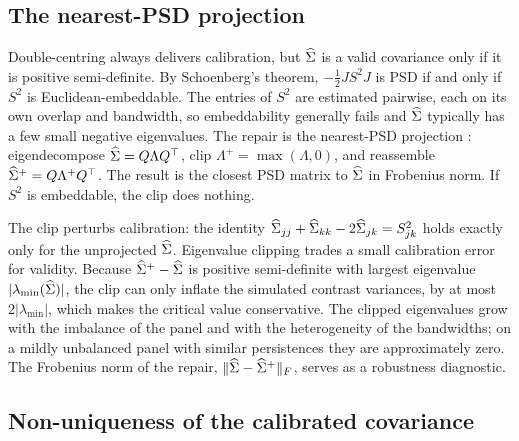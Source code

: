 \subsection{The nearest-PSD projection}
\label{sec:mds-psd}

Double-centring always delivers calibration, but $\widehat{\Sigma}$ is a valid covariance only if it
is positive semi-definite. By Schoenberg's theorem, $-\tfrac12 J S^2 J$ is PSD if and
only if $S^2$ is Euclidean-embeddable. The entries of $S^2$ are estimated pairwise, each
on its own overlap and bandwidth, so embeddability generally fails and $\widehat{\Sigma}$ typically
has a few small negative eigenvalues. The repair is the nearest-PSD projection
\citep{higham1988}: eigendecompose $\widehat{\Sigma} = Q\Lambda Q^\top$, clip
$\Lambda^{+} = \max(\Lambda, 0)$, and reassemble $\widehat{\Sigma}^{+} = Q\Lambda^{+}Q^\top$. The
result is the closest PSD matrix to $\widehat{\Sigma}$ in Frobenius norm. If $S^2$ is embeddable, the
clip does nothing.

\begin{remark}
The clip perturbs calibration: the identity $\widehat{\Sigma}_{jj}+\widehat{\Sigma}_{kk}-2\widehat{\Sigma}_{jk} = S^2_{jk}$
holds exactly only for the unprojected $\widehat{\Sigma}$. Eigenvalue clipping trades a small
calibration error for validity. Because $\widehat{\Sigma}^{+}-\widehat{\Sigma}$ is positive semi-definite with
largest eigenvalue $|\lambda_{\min}(\widehat{\Sigma})|$, the clip can only inflate the simulated
contrast variances, by at most $2|\lambda_{\min}|$, which makes the critical value
conservative. The clipped eigenvalues grow with the imbalance of the panel and with the
heterogeneity of the bandwidths; on a mildly unbalanced panel with similar persistences
they are approximately zero. The Frobenius norm of the repair,
$\lVert \widehat{\Sigma} - \widehat{\Sigma}^{+} \rVert_{F}$, serves as a robustness diagnostic.
\end{remark}

\subsection{Non-uniqueness of the calibrated covariance}
\label{sec:nonuniqueness}

